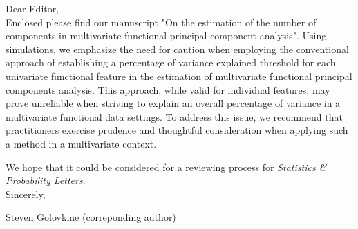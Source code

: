 \documentclass{article}
\date{\today}
\begin{document}
Dear Editor,
\\

Enclosed please find our manuscript "On the estimation of the number of components in multivariate functional principal component analysis". Using simulations, we emphasize the need for caution when employing the conventional approach of establishing a percentage of variance explained threshold for each univariate functional feature in the estimation of multivariate functional principal components analysis. This approach, while valid for individual features, may prove unreliable when striving to explain an overall percentage of variance in a multivariate functional data settings. To address this issue, we recommend that practitioners exercise prudence and thoughtful consideration when applying such a method in a multivariate context.


We hope that it could be considered for a reviewing process for \emph{Statistics \& Probability Letters}.
\\

Sincerely,

Steven Golovkine (correponding author)
\end{document}
